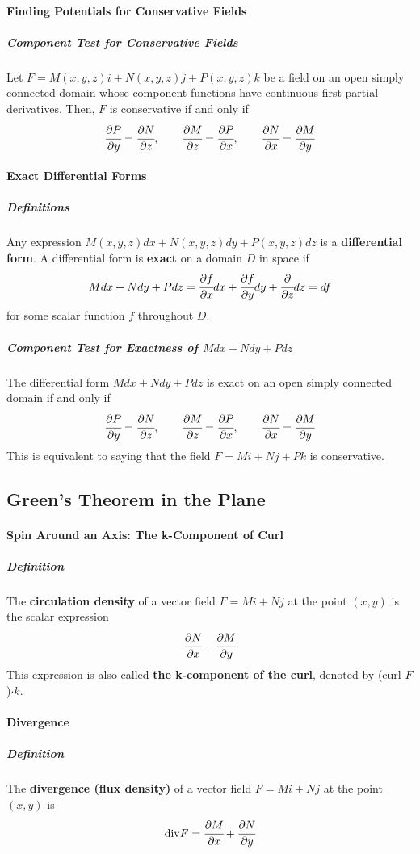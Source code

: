 \documentclass{article}
\begin{document}
            \paragraph{Finding Potentials for Conservative Fields}
                \subparagraph{Component Test for Conservative Fields} Let $F=M(x,y,z)i+N(x,y,z)j+P(x,y,z)k$ be a field on an open simply connected domain whose component functions have continuous first partial derivatives. Then, $F$ is conservative if and only if 
                \[\cfrac{\partial P}{\partial y}=\cfrac{\partial N}{\partial z},\qquad\cfrac{\partial M}{\partial z}=\cfrac{\partial P}{\partial x},\qquad\cfrac{\partial N}{\partial x}=\cfrac{\partial M}{\partial y}\]
            \paragraph{Exact Differential Forms}
                \subparagraph{Definitions} Any expression $M(x,y,z)dx+N(x,y,z)dy+P(x,y,z)dz$ is a \textbf{differential form}. A differential form is \textbf{exact} on a domain $D$ in space if
                    \[Mdx+Ndy+Pdz=\cfrac{\partial f}{\partial x}dx+\cfrac{\partial f}{\partial y}dy+\cfrac{\partial }{\partial z}dz=df\]
                for some scalar function $f$ throughout $D$.
                \subparagraph{Component Test for Exactness of $Mdx+Ndy+Pdz$}
                The differential form $Mdx+Ndy+Pdz$ is exact on an open simply connected domain if and only if
                \[\cfrac{\partial P}{\partial y}=\cfrac{\partial N}{\partial z},\qquad\cfrac{\partial M}{\partial z}=\cfrac{\partial P}{\partial x},\qquad\cfrac{\partial N}{\partial x}=\cfrac{\partial M}{\partial y}\]
                This is equivalent to saying that the field $F=Mi+Nj+Pk$ is conservative.
        \subsection{Green's Theorem in the Plane}
            \paragraph{Spin Around an Axis: The k-Component of Curl}
                \subparagraph{Definition} The \textbf{circulation density} of a vector field $F=Mi+Nj$ at the point $(x,y)$ is the scalar expression
                \[\cfrac{\partial N}{\partial x}-\cfrac{\partial M} {\partial y}\]
                This expression is also called \textbf{the k-component of the curl}, denoted by (curl $F$)$\cdot k$.
            \paragraph{Divergence}
                \subparagraph{Definition} The \textbf{divergence (flux density)} of a vector field $F=Mi+Nj$ at the point $(x,y)$ is
                \[\text{div}F=\cfrac{\partial M}{\partial x}+\cfrac{\partial N}{\partial y}\]
\end{document}
